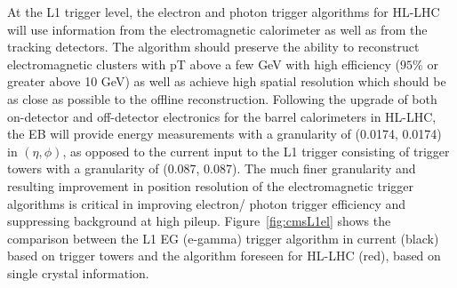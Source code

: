At the L1 trigger level, the electron and photon trigger algorithms for HL-LHC will use information from the electromagnetic calorimeter as well as from the tracking detectors.
The algorithm should preserve the ability to reconstruct electromagnetic clusters with pT above a few GeV with high efficiency ($95\%$ or
greater above 10 GeV) as well as achieve high spatial resolution which should be as close as possible to the offline reconstruction.
Following the upgrade of both on-detector and off-detector electronics for the barrel calorimeters
in HL-LHC, the EB will provide energy measurements with a granularity of (0.0174, 0.0174)
in $(\eta, \phi)$, as opposed to the current input to the L1 trigger consisting of trigger towers
with a granularity of (0.087, 0.087). The much finer granularity and resulting improvement in position resolution of the electromagnetic trigger algorithms is critical in improving electron/
photon trigger efficiency and suppressing background at high pileup.
Figure~\ref{fig:cmsL1el} shows the comparison between the L1 EG (e-gamma) trigger algorithm in current (black)
based on trigger towers and the algorithm foreseen for HL-LHC (red), based on single crystal information.


